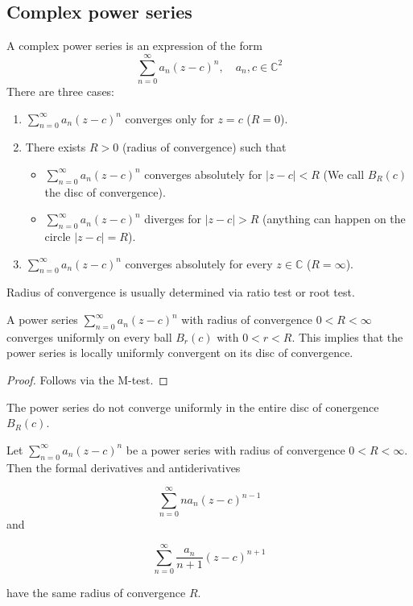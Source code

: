 \subsection{Complex power series}

\begin{theorem}
	A complex power series is an expression of the form
	\[
		\sum_{n = 0}^{\infty} a_n {(z - c)}^n, \quad a_n, c \in \mathbb{C}^2
	\]
	There are three cases:

	\begin{enumerate}
		\item $\sum_{n = 0}^{\infty} a_n {(z - c)}^n$ converges only for $z = c$ ($R = 0$).
		\item There exists $R > 0$ (radius of convergence) such that
		\begin{itemize}
			\item $\sum_{n = 0}^{\infty} a_n {(z - c)}^n$ converges absolutely for $|z - c| < R$ (We call $B_R(c)$ the disc of convergence).
			\item $\sum_{n = 0}^{\infty} a_n {(z - c)}^n$ diverges for $|z - c| > R$ (anything can happen on the circle $|z - c| = R$).
		\end{itemize}
		\item $\sum_{n = 0}^{\infty} a_n {(z - c)}^n$ converges absolutely for every $z \in \mathbb{C}$ ($R = \infty$).
	\end{enumerate}
\end{theorem}

\begin{remark}
	Radius of convergence is usually determined via ratio test or root test.
\end{remark}

\begin{theorem}
	A power series $\sum_{n = 0}^{\infty} a_n {(z - c)}^n$ with radius of convergence $0 < R < \infty$ converges uniformly on every ball $B_r(c)$ with $0 < r < R$. This implies that the power series is locally uniformly convergent on its disc of convergence.
\end{theorem}

\begin{proof}
	Follows via the M-test.
\end{proof}

\begin{remark}
	The power series do not converge uniformly in the entire disc of conergence $B_R(c)$.
\end{remark}

\begin{proposition}
	Let $\sum_{n = 0}^{\infty} a_n {(z - c)}^n$ be a power series with radius of convergence $0 < R < \infty$. Then the formal derivatives and antiderivatives

	\[\sum_{n = 0}^{\infty} n a_n {(z - c)}^{n - 1}\] and

	\[\sum_{n = 0}^{\infty} \frac{a_n}{n + 1} {(z - c)}^{n + 1}\]

	have the same radius of convergence $R$.
\end{proposition}

